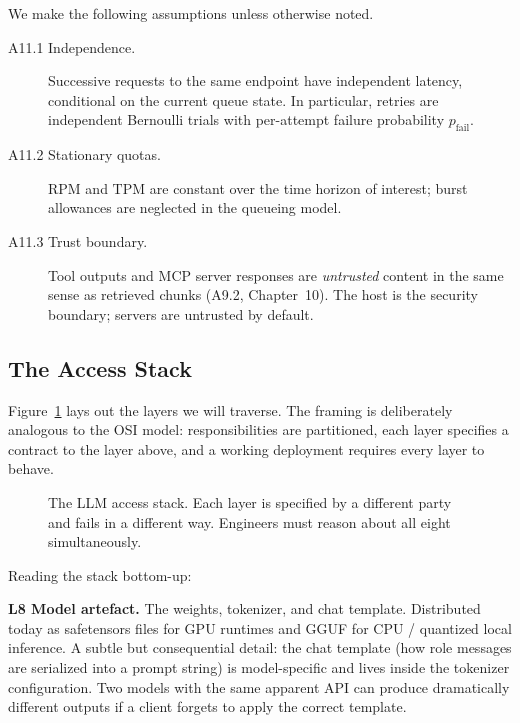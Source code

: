 \begin{notationbox}
We make the following assumptions unless otherwise noted.
\begin{description}
  \item[A11.1 Independence.] Successive requests to the same
    endpoint have independent latency, conditional on the current
    queue state. In particular, retries are independent Bernoulli
    trials with per-attempt failure probability $p_\mathrm{fail}$.
  \item[A11.2 Stationary quotas.] $\mathrm{RPM}$ and $\mathrm{TPM}$
    are constant over the time horizon of interest; burst
    allowances are neglected in the queueing model.
  \item[A11.3 Trust boundary.] Tool outputs and MCP server
    responses are \emph{untrusted} content in the same sense as
    retrieved chunks (A9.2, Chapter~10). The host is the security
    boundary; servers are untrusted by default.
\end{description}
\end{notationbox}

\subsection{The Access Stack}

Figure~\ref{fig:access_stack} lays out the layers we will traverse.
The framing is deliberately analogous to the OSI model:
responsibilities are partitioned, each layer specifies a contract
to the layer above, and a working deployment requires every layer
to behave.

\begin{figure}[H]
  \centering
  
  \caption{The LLM access stack. Each layer is specified by a
           different party and fails in a different way.
           Engineers must reason about all eight simultaneously.}
  \label{fig:access_stack}
\end{figure}

Reading the stack bottom-up:

\textbf{L8 Model artefact.} The weights, tokenizer, and chat
template. Distributed today as safetensors \citep{safetensors_docs}
files for GPU runtimes and GGUF for CPU / quantized local
inference. A subtle but consequential detail: the chat template
(how role messages are serialized into a prompt string) is
model-specific and lives inside the tokenizer configuration. Two
models with the same apparent API can produce dramatically
different outputs if a client forgets to apply the correct
template.

